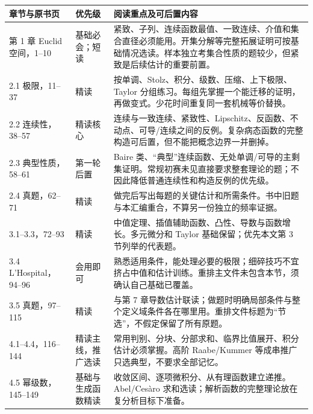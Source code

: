 \documentclass[UTF8,a4paper,11pt,fontset=windows]{ctexart}
\renewcommand{\arraystretch}{1.25}
\begin{document}
\begingroup\small\renewcommand{\arraystretch}{1.13}
\begin{longtable}{P{3.0cm}P{1.5cm}P{10.9cm}}
\toprule
章节与原书页 & 优先级 & 阅读重点及可后置内容\\
\midrule\endhead
第 1 章 Euclid 空间，1--10 & 基础必会；短读 &
紧致、子列、连续函数最值、一致连续、介值和集合直径必须能用。开集分解等完整拓展证明可按基础情况选读。样本独立考集合性质的题较少，但紧致是后续估计的重要前置。\\
2.1 极限，11--37 & 精读 &
按单调、Stolz、积分、级数、压缩、上下极限、Taylor 分组练习。每组先掌握一个能迁移的证明，再做变式。少花时间重复同一套机械等价替换。\\
2.2 连续性，38--57 & 精读核心 &
连续与一致连续、紧致性、Lipschitz、反函数、不动点、可导/连续之间的反例。复杂病态函数的完整构造可后置，但不能把概念边界一并删掉。\\
2.3 典型性质，58--61 & 第一轮后置 &
Baire 类、“典型”连续函数、无处单调/可导的主剩集证明。常规初赛未见直接要求整套理论的题；不因此降低普通连续性和构造反例的优先级。\\
2.4 真题，62--71 & 精读 &
做完后写出每题的关键估计和所需条件。书中旧题与本汇编重合，不算另一份独立的频率证据。\\
3.1--3.3，72--93 & 精读 &
中值定理、插值辅助函数、凸性、导数与函数增长。多元微分和 Taylor 基础保留；优先本文第 3 节列举的代表题。\\
3.4 L'Hospital，94--96 & 会用即可 &
熟悉适用条件，能处理必要的极限；细碎技巧不宜挤占中值和估计训练。重排主文件未包含本节，须确认自己基础已覆盖。\\
3.5 真题，97--115 & 精读 &
与第 7 章导数估计联读；做题时明确局部条件与整个定义域条件各在哪里用。重排文件标题为“节选”，不假定保留了所有原题。\\
4.1--4.4，116--144 & 精读主线，推广选读 &
常用判别、分块、分部求和、临界比值展开、积分估计必须掌握。高阶 Raabe/Kummer 等成串推广只选典型，不要求全部记忆。\\
4.5 幂级数，145--149 & 基础与生成函数精读 &
收敛区间、逐项微积分、从有理函数建立递推。Abel/Cesàro 求和选读；解析函数的完整理论放在复分析目标下准备。\\
\bottomrule
\end{longtable}\endgroup
\end{document}
